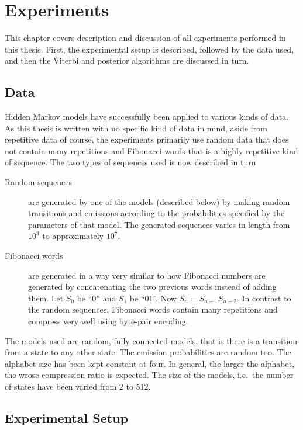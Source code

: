 \chapter{Experiments}
\label{cha:experiments}

This chapter covers description and discussion of all experiments performed in
this thesis. First, the experimental setup is described, followed by the data
used, and then the Viterbi and posterior algorithms are discussed in turn.

\section{Data}

Hidden Markov models have successfully been applied to various kinds of
data.  As this thesis is written with no specific kind of
data in mind, aside from repetitive data of course, the experiments primarily
use random data that does not contain many repetitions and Fibonacci words that
is a highly repetitive kind of sequence. The two types of sequences used is now
described in turn.

\begin{description}
\item[Random sequences] are generated by one of the models (described below) by
  making random transitions and emissions according to the probabilities
  specified by the parameters of that model. The generated sequences varies in
  length from $10^3$ to approximately $10^7$.
\item[Fibonacci words] are generated in a way very similar to how Fibonacci
  numbers are generated by concatenating the two previous words instead of
  adding them. Let $S_0$ be ``0'' and $S_1$ be ``01''. Now
  $S_n=S_{n-1}S_{n-2}$. In contrast to the random sequences, Fibonacci words
  contain many repetitions and compress very well using byte-pair
  encoding. 
\end{description}

The models used are random, fully connected models, that is there is a
transition from a state to any other state. The emission probabilities are
random too. The alphabet size has been kept constant at four. In general, the
larger the alphabet, the wrose compression ratio is expected. The size of the
models, i.e.\ the number of states have been varied from 2 to 512.

\section{Experimental Setup}

